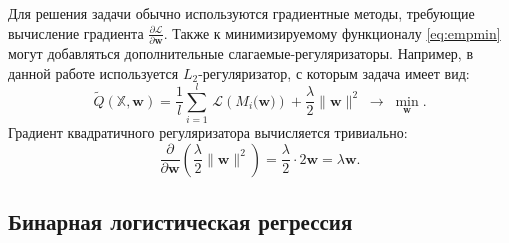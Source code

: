 \documentclass[12pt]{article}
\renewcommand{\vec}[1]{\mathbf{#1}}
\newcommand{\pder}[2][]{\frac{\partial#1}{\partial#2}}
\begin{document}
Для решения задачи обычно используются градиентные методы, требующие вычисление градиента $\pder[\mathcal{L}]{\vec{w}}$. Также к минимизируемому функционалу \eqref{eq:empmin} могут добавляться дополнительные слагаемые-регуляризаторы. Например, в данной работе используется $L_2$-регуляризатор, с которым задача имеет вид:
\begin{equation}
    \widetilde{Q}(\mathbb{X}, \vec{w}) = \frac{1}{l}\sum_{i=1}^l\,
    \mathcal{L}\left({M_i(\vec{w}})\right) + \frac{\lambda}{2}\|\vec{w}\|^2\;\rightarrow \;\min_\vec{w}.
\end{equation}
Градиент квадратичного регуляризатора вычисляется тривиально:
\begin{equation}
    \label{eq:loss_reg}
    \pder{\vec{w}}\left(\frac{\lambda}{2}\|\vec{w}\|^2\right) = \frac{\lambda}{2}\cdot 2\vec{w} = \lambda \vec{w}.
\end{equation}

\subsection{Бинарная логистическая регрессия}
\end{document}
